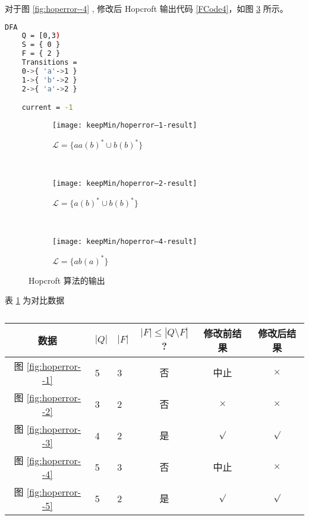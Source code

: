 对于图 \ref{fig:hoperror--4} , 修改后 Hopcroft 输出代码 \ref{FCode4}，如图 \ref{fig:hoperror--4-result} 所示。
\begin{lstlisting}[language=bash,label={FCode4},caption={图 \ref{fig:hoperror--4} 输出}]
    DFA
    Q = [0,3)
    S = { 0 }
    F = { 2 }
    Transitions =
    0->{ 'a'->1 }
    1->{ 'b'->2 }
    2->{ 'a'->2 }

    current = -1
\end{lstlisting}


\begin{figure}[!htbp]
    \centering
    \begin{subfigure}[b]{0.7\textwidth}
        \texttt{[image: keepMin/hoperror--1-result]}
        \caption{$\mathcal{L}=\{aa(b)^* \cup b(b)^*\}$}
        \label{fig:hoperror--1-result}
    \end{subfigure}
    \\
    \begin{subfigure}[b]{0.7\textwidth}
        \texttt{[image: keepMin/hoperror--2-result]}
        \caption{$\mathcal{L}=\{a(b)^* \cup b(b)^*\}$}
        \label{fig:hoperror--2-result}
    \end{subfigure}
    \\
    \begin{subfigure}[b]{0.7\textwidth}
        \texttt{[image: keepMin/hoperror--4-result]}
        \caption{$\mathcal{L}=\{ab(a)^*\}$}
        \label{fig:hoperror--4-result}
    \end{subfigure}
    \caption{Hopcroft 算法的输出 }
    \label{fig:hopcerror-result}
  \end{figure}

  表 \ref{tab:KeepMinResultofAll-hop} 为对比数据

  \begin{table}[!htbp]
    \caption{  }
    \label{tab:KeepMinResultofAll-hop}
    \centering
    \small%
    \setlength{\tabcolsep}{4pt}%
    \renewcommand{\arraystretch}{1.2}%
    \begin{tabular}{c p{2em}<{\centering}p{2em}<{\centering}ccc }  %
        \toprule %
        数据 & $|Q|$ & $|F|$ & $|F|\leq |Q \setminus F|$? & 修改前结果 &  修改后结果  \\
        \midrule
        图 \ref{fig:hoperror--1}        & 5 & 3 & 否 & 中止       & $\times$        \\
        图 \ref{fig:hoperror--2}        & 3 & 2 & 否 & $\times$   & $\times$       \\
        图 \ref{fig:hoperror--3}        & 4 & 2 & 是 & $\surd$    & $\surd$       \\
        图 \ref{fig:hoperror--4}        & 5 & 3 & 否 & 中止       & $\times$       \\
        图 \ref{fig:hoperror--5}        & 5 & 2 & 是 & $\surd$    & $\surd$       \\
        \bottomrule%
    \end{tabular}
\end{table}

